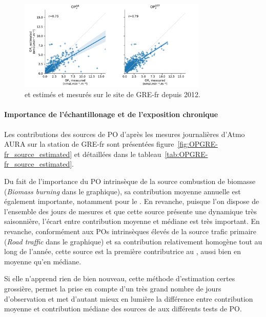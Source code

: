 \begin{figure}[ht]
    \centering
    \includegraphics[width=0.8\textwidth]{figures/chapter05/OPGRE-fr_estimated_scatter.pdf}
    \caption{\POAAv{} et \PODTTv{} estimés et mesurés sur le site de GRE-fr depuis 2012.}
    \label{fig:OPGRE-fr-estimated_scatter}
\end{figure}

\paragraph{Importance de l'échantillonage et de l'exposition chronique}%
\label{par:importance_de_l_échantillonage_et_de_l_exposition_chronique}

Les contributions des sources de PO d'après les mesures journalières d'Atmo AURA sur la
station de GRE-fr sont présentées figure~\ref{fig:OPGRE-fr_source_estimated} et détaillées
dans le tableau~\ref{tab:OPGRE-fr_source_estimated}.

Du fait de l'importance du PO intrinsèque de la source combustion de biomasse
(\textit{Biomass burning} dans le graphique), sa contribution moyenne annuelle est
également importante, notamment pour le \POAAv.  En revanche, puisque l'on dispose de
l'ensemble des jours de mesures et que cette source présente une dynamique très
saisonnière, l'écart entre contribution moyenne et médiane est très important.
En revanche, conformément aux POs intrinsèques élevés de la source trafic primaire
(\textit{Road traffic} dans le graphique) et sa contribution relativement homogène tout au
long de l'année, cette source est la première contributrice au \PODTTv, aussi bien en
moyenne qu'en médiane.

Si elle n'apprend rien de bien nouveau, cette méthode d'estimation certes grossière,
permet la prise en compte d'un très grand nombre de jours d'observation et met d'autant
mieux en lumière la différence entre contribution moyenne et contribution médiane des
sources de \PMdix{} aux différents tests de PO.

